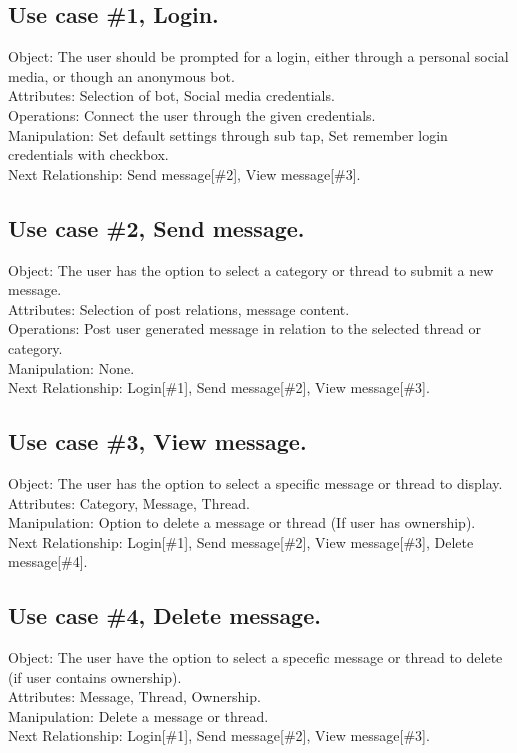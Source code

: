 \subsection{Use case \#1, Login.}
\label{usecase_bot}
Object: The user should be prompted for a login, either through a personal social media, or though an anonymous bot.\\
Attributes: Selection of bot, Social media credentials.\\
Operations: Connect the user through the given credentials.\\
Manipulation: Set default settings through sub tap,  Set remember login credentials with checkbox.\\
Next Relationship: Send message[\#2], View message[\#3].
\noindent
\subsection{Use case \#2, Send message.}
Object: The user has the option to select a category or thread to submit a new message.\\
Attributes: Selection of post relations, message content.\\
Operations: Post user generated message in relation to the selected thread or category.\\
Manipulation: None.\\
Next Relationship: Login[\#1], Send message[\#2], View message[\#3].
\noindent
\subsection{Use case \#3, View message.}
Object: The user has the option to select a specific message or thread to display.\\
Attributes: Category, Message, Thread.\\
Manipulation: Option to delete a message or thread (If user has ownership).\\
Next Relationship: Login[\#1], Send message[\#2], View message[\#3], Delete message[\#4].
\noindent
\subsection{Use case \#4, Delete message.}
Object: The user have the option to select a specefic message or thread to delete (if user contains ownership).\\
Attributes: Message, Thread, Ownership.\\
Manipulation: Delete a message or thread.\\
Next Relationship: Login[\#1], Send message[\#2], View message[\#3].